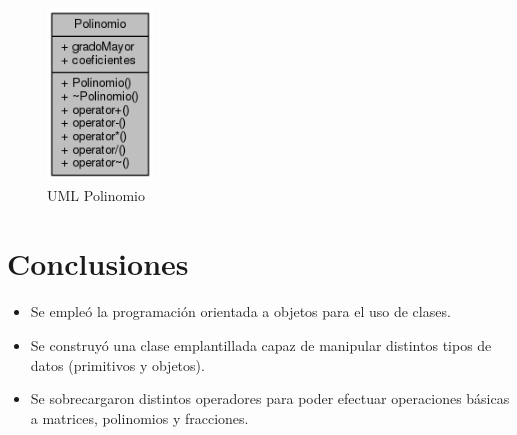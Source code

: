 \documentclass[11pt]{article}
\begin{document}
\begin{figure}[htbp]
\centering
\includegraphics[width=0.25\textwidth]{img/UMLpol.png}
\caption{\label{fig:umlpol} UML Polinomio}
\end{figure}
 
\newpage
\section{Conclusiones}
\begin{itemize}
\item Se empleó la programación orientada a objetos para el uso de clases.
\item Se construyó una clase emplantillada capaz de manipular distintos tipos de datos (primitivos y objetos).
\item Se sobrecargaron distintos operadores para poder efectuar operaciones básicas a matrices, polinomios y fracciones. 
\end{itemize}
\end{document}
